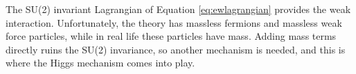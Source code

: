 The SU(2) invariant Lagrangian of Equation \ref{eq:ewlagrangian} provides the weak interaction. Unfortunately, the theory has massless fermions and massless weak force particles, while in real life these particles have mass. Adding mass terms directly ruins the SU(2) invariance, so another mechanism is needed, and this is where the Higgs mechanism comes into play.  

